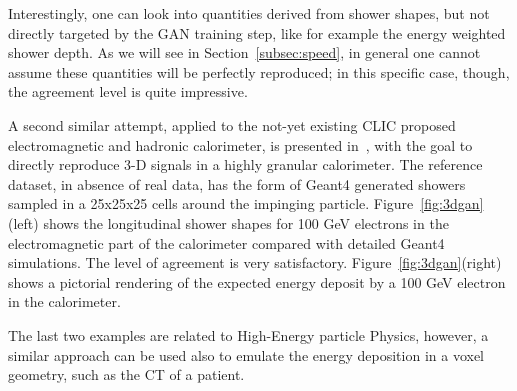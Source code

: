 Interestingly, one can look into quantities derived from shower shapes, but not directly targeted by the GAN training step, like for example the energy weighted shower depth. As we will see in Section~\ref{subsec:speed}, in general one cannot assume these quantities will be perfectly reproduced; in this specific case, though, the agreement level is quite impressive.


A second similar attempt, applied to the not-yet existing CLIC proposed electromagnetic and hadronic calorimeter, is presented in~\cite{3dgan}, with the goal to directly reproduce 3-D signals in a highly granular calorimeter. The reference dataset, in absence of real data, has the form of Geant4 generated showers sampled in a 25x25x25 cells around the impinging particle.
Figure~\ref{fig:3dgan}(left) shows the longitudinal shower shapes for 100 GeV electrons in the electromagnetic part of the calorimeter compared with detailed Geant4 simulations. The level of agreement is very satisfactory. Figure~\ref{fig:3dgan}(right) shows a pictorial rendering of the expected energy deposit by a 100 GeV electron in the calorimeter.

The last two examples are related to High-Energy particle Physics, however, a similar approach can be used also to emulate the energy deposition in a voxel geometry, such as the CT of a patient.

